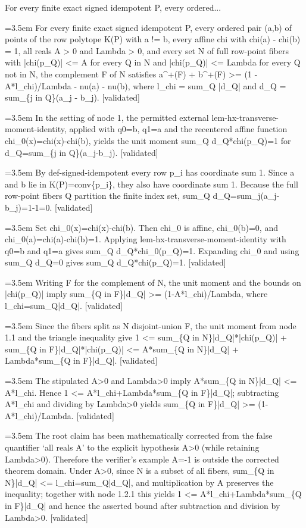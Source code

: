 \documentclass{article}
\newcommand{\step}[1]{\par\noindent\hangindent=3.5em\hangafter=1%
  \makebox[3.5em][l]{\textbf{#1.}}}
\newcommand{\steptag}[1]{\hfill{\small\textsf{[#1]}}}
\begin{document}
\begin{proofbox}{For every finite exact signed idempotent P, every ordered...}
\step{1} For every finite exact signed idempotent P, every ordered pair (a,b) of points of the row polytope K(P) with a != b, every affine chi with chi(a) - chi(b) = 1, all reals A > 0 and Lambda > 0, and every set N of full row-point fibers with |chi(p\_Q)| <= A for every Q in N and |chi(p\_Q)| <= Lambda for every Q not in N, the complement F of N satisfies a\textasciicircum{}+(F) + b\textasciicircum{}+(F) >= (1 - A*l\_chi)/Lambda - nu(a) - nu(b), where l\_chi = sum\_Q |d\_Q| and d\_Q = sum\_\{j in Q\}(a\_j - b\_j). \steptag{validated} \\[6pt]
\step{1.1} In the setting of node 1, the permitted external lem-hx-transverse-moment-identity, applied with q0=b, q1=a and the recentered affine function chi\_0(x)=chi(x)-chi(b), yields the unit moment sum\_Q d\_Q*chi(p\_Q)=1 for d\_Q=sum\_\{j in Q\}(a\_j-b\_j). \steptag{validated} \\[6pt]
\step{1.1.1} By def-signed-idempotent every row p\_i has coordinate sum 1. Since a and b lie in K(P)=conv\{p\_i\}, they also have coordinate sum 1. Because the full row-point fibers Q partition the finite index set, sum\_Q d\_Q=sum\_j(a\_j-b\_j)=1-1=0. \steptag{validated} \\[4pt]
\step{1.1.2} Set chi\_0(x)=chi(x)-chi(b). Then chi\_0 is affine, chi\_0(b)=0, and chi\_0(a)=chi(a)-chi(b)=1. Applying lem-hx-transverse-moment-identity with q0=b and q1=a gives sum\_Q d\_Q*chi\_0(p\_Q)=1. Expanding chi\_0 and using sum\_Q d\_Q=0 gives sum\_Q d\_Q*chi(p\_Q)=1. \steptag{validated} \\[4pt]
\step{1.2} Writing F for the complement of N, the unit moment and the bounds on |chi(p\_Q)| imply sum\_\{Q in F\}|d\_Q| >= (1-A*l\_chi)/Lambda, where l\_chi=sum\_Q|d\_Q|. \steptag{validated} \\[6pt]
\step{1.2.1} Since the fibers split as N disjoint-union F, the unit moment from node 1.1 and the triangle inequality give 1 <= sum\_\{Q in N\}|d\_Q|*|chi(p\_Q)| + sum\_\{Q in F\}|d\_Q|*|chi(p\_Q)| <= A*sum\_\{Q in N\}|d\_Q| + Lambda*sum\_\{Q in F\}|d\_Q|. \steptag{validated} \\[4pt]
\step{1.2.2} The stipulated A>0 and Lambda>0 imply A*sum\_\{Q in N\}|d\_Q| <= A*l\_chi. Hence 1 <= A*l\_chi+Lambda*sum\_\{Q in F\}|d\_Q|; subtracting A*l\_chi and dividing by Lambda>0 yields sum\_\{Q in F\}|d\_Q| >= (1-A*l\_chi)/Lambda. \steptag{validated} \\[4pt]
\step{1.2.3} The root claim has been mathematically corrected from the false quantifier ‘all reals A’ to the explicit hypothesis A>0 (while retaining Lambda>0). Therefore the verifier’s example A=-1 is outside the corrected theorem domain. Under A>0, since N is a subset of all fibers, sum\_\{Q in N\}|d\_Q| <= l\_chi=sum\_Q|d\_Q|, and multiplication by A preserves the inequality; together with node 1.2.1 this yields 1 <= A*l\_chi+Lambda*sum\_\{Q in F\}|d\_Q| and hence the asserted bound after subtraction and division by Lambda>0. \steptag{validated} \\[4pt]

\end{proofbox}
\end{document}
